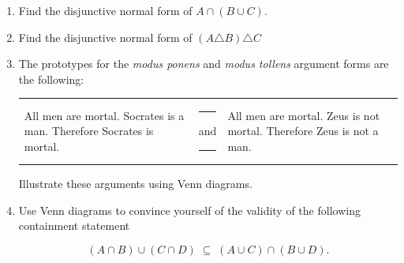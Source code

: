\begin{enumerate}
\item  Find the disjunctive normal form of $A \cap (B \cup C)$.


\wbvfill

\workbookpagebreak

\item  Find the disjunctive normal form of $(A \triangle B) \triangle C$


\wbvfill

\item The prototypes for the \emph{modus ponens} and \emph{modus tollens}
argument forms are the following:

\begin{tabular}{lcl}
\begin{minipage}{.3\textwidth}All men are mortal. \newline %
Socrates is a man. \newline
Therefore Socrates is mortal.\end{minipage} & \rule{16pt}{0pt} and \rule{16pt}{0pt} & %
 \begin{minipage}{.3\textwidth}All men are mortal. \newline %
Zeus is not mortal. \newline
Therefore Zeus is not a man.\end{minipage}
\end{tabular}

Illustrate these arguments using Venn diagrams.

 
 \wbvfill
 
 \workbookpagebreak
 \hintspagebreak

\item Use Venn diagrams to convince yourself of the validity of
the following containment statement

\[ (A \cap B) \cup (C \cap D) \; \subseteq \; (A \cup C) \cap (B \cup D).\]


\end{enumerate}
